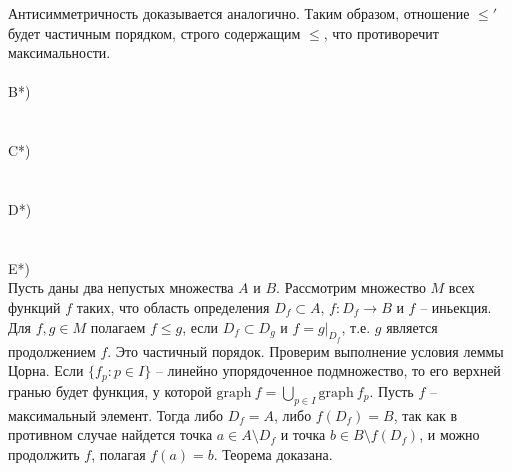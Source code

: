 		Антисимметричность доказывается аналогично. Таким образом, отношение $\leqslant'$ будет частичным порядком, строго содержащим $\leqslant$, что противоречит максимальности.
		\\ \\
		B*)\\
		\\ \\
		C*)\\
		\\ \\
		D*)\\
		\\ \\
		E*)\\
		Пусть даны два непустых множества $A$ и $B$. Рассмотрим множество $M$ всех функций $f$ таких, что область определения $D_f\subset A$, $f\colon D_f\to B$ и $f$ -- иньекция.\\
		Для $f,g\in M$ полагаем $f\leqslant g$, если $D_f\subset D_g$ и $f=g|_{D_f}$, т.е. $g$ является продолжением $f$. Это частичный порядок.
		Проверим выполнение условия леммы Цорна. Если $\{f_p: p\in I\}$ -- линейно упорядоченное подмножество, то его верхней гранью будет функция, у которой ${\mathrm {graph}} \  f = \bigcup_{p\in I} {\mathrm {graph}} \ f_p$.
		Пусть $f$ -- максимальный элемент. Тогда либо $D_f=A$, либо $f(D_f)=B$, так как в противном случае найдется точка $a\in A\setminus D_f$ и точка $b\in B\setminus f(D_f)$, и можно продолжить $f$, полагая $f(a)=b$.
		Теорема доказана.
		\\ \\
